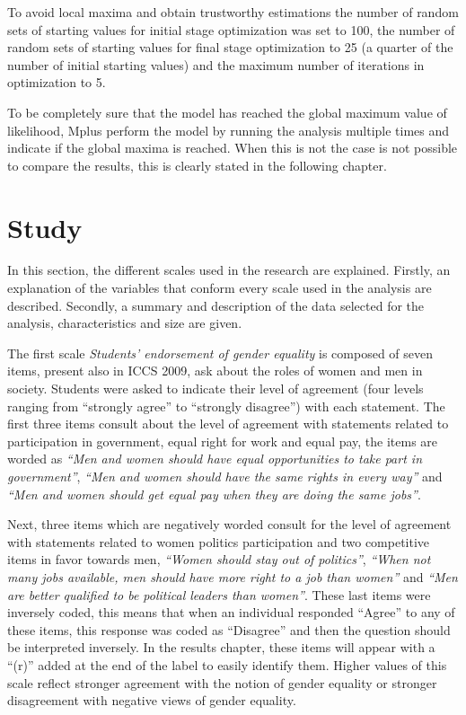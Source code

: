 \documentclass[12pt,a4paper,oneside]{reedthesis}
\begin{document}
To avoid local maxima and obtain trustworthy estimations the number of random sets of starting values for initial stage optimization was set to 100, the number of random sets of starting values for final stage optimization to 25 (a quarter of the number of initial starting values) and the maximum number of iterations in optimization to 5.

To be completely sure that the model has reached the global maximum value of likelihood, Mplus perform the model by running the analysis multiple times and indicate if the global maxima is reached. When this is not the case is not possible to compare the results, this is clearly stated in the following chapter.

\hypertarget{study}{%
\section{Study}\label{study}}

In this section, the different scales used in the research are explained. Firstly, an explanation of the variables that conform every scale used in the analysis are described. Secondly, a summary and description of the data selected for the analysis, characteristics and size are given.

The first scale \emph{Students' endorsement of gender equality} is composed of seven items, present also in ICCS 2009, ask about the roles of women and men in society. Students were asked to indicate their level of agreement (four levels ranging from ``strongly agree'' to ``strongly disagree'') with each statement. The first three items consult about the level of agreement with statements related to participation in government, equal right for work and equal pay, the items are worded as \emph{``Men and women should have equal opportunities to take part in government''}, \emph{``Men and women should have the same rights in every way''} and \emph{``Men and women should get equal pay when they are doing the same jobs''}.

Next, three items which are negatively worded consult for the level of agreement with statements related to women politics participation and two competitive items in favor towards men, \emph{``Women should stay out of politics''}, \emph{``When not many jobs available, men should have more right to a job than women''} and \emph{``Men are better qualified to be political leaders than women''}. These last items were inversely coded, this means that when an individual responded ``Agree'' to any of these items, this response was coded as ``Disagree'' and then the question should be interpreted inversely. In the results chapter, these items will appear with a ``(r)'' added at the end of the label to easily identify them. Higher values of this scale reflect stronger agreement with the notion of gender equality or stronger disagreement with negative views of gender equality.
\end{document}
